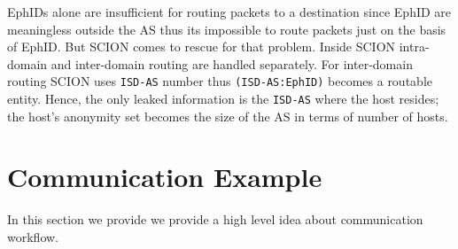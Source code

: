 EphIDs alone are insufficient for routing packets to a destination since EphID are meaningless outside the AS thus its impossible to route packets just on the basis of EphID. But SCION comes to rescue for that problem. Inside SCION intra-domain and inter-domain routing are handled separately. For inter-domain routing SCION uses \texttt{ISD-AS} number thus \texttt{(ISD-AS:EphID)} becomes a routable entity. Hence, the only leaked information is the \texttt{ISD-AS} where the host resides; the host's anonymity set becomes the size of the AS in terms of number of hosts.

\section{Communication Example} \label{sec:comm}
In this section we provide we provide a high level idea about communication workflow.